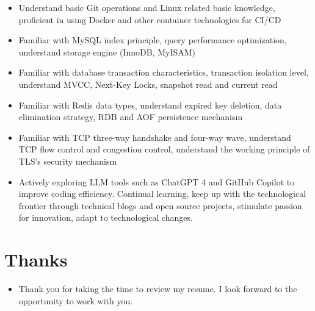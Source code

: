 \documentclass{resume}
\newcommand{\en}[1]{#1}
\newcommand{\zh}[1]{}
\begin{document}
\begin{itemize}[parsep=0.25ex]
      \item \en{Understand basic Git operations and Linux related basic knowledge, proficient in using Docker and other container technologies for CI/CD}
            \zh{了解Git基本操作以及Linux相关基本知识，熟练使用Docker等容器技术进行CI/CD}

      \item \en{Familiar with MySQL index principle, query performance optimization, understand storage engine (InnoDB, MyISAM)}
            \zh{熟悉 MySQL 索引原理、查询性能优化，了解存储引擎 (InnoDB、MyISAM)}

      \item \en{Familiar with database transaction characteristics, transaction isolation level, understand MVCC, Next-Key Locks, snapshot read and current read}
            \zh{熟悉数据库事务特性、事务隔离级别，了解 MVCC、Next-Key Locks、快照读与当前读}

      \item \en{Familiar with Redis data types, understand expired key deletion, data elimination strategy, RDB and AOF persistence mechanism}
            \zh{熟悉 Redis 数据类型，了解过期键删除、数据淘汰策略、RDB 和 AOF 持久化机制}

      \item \en{Familiar with TCP three-way handshake and four-way wave, understand TCP flow control and congestion control, understand the working principle of TLS's security mechanism}
            \zh{熟悉 TCP 三次握手和四次挥手，了解 TCP 流量控制和拥塞控制，了解 TLS的安全机制的工作原理}

      \item \en{Actively exploring LLM tools such as ChatGPT 4 and GitHub Copilot to improve coding efficiency. Continual learning, keep up with the technological frontier through technical blogs and open source projects, stimulate passion for innovation, adapt to technological changes.}
            \zh{积极探索如ChatGPT 4和GitHub Copilot等LLM工具，提升编码效率。持续学习，通过技术博客、开源项目保持技术前沿，激发创新热情，适应技术变革。}
\end{itemize}

\section{\en{Thanks}\zh{致谢}}
\begin{itemize}
      \item \en{Thank you for taking the time to review my resume. I look forward to the opportunity to work with you.}
            \zh{感谢您花时间阅读我的简历，期待能有机会和您共事}
\end{itemize}
\end{document}
